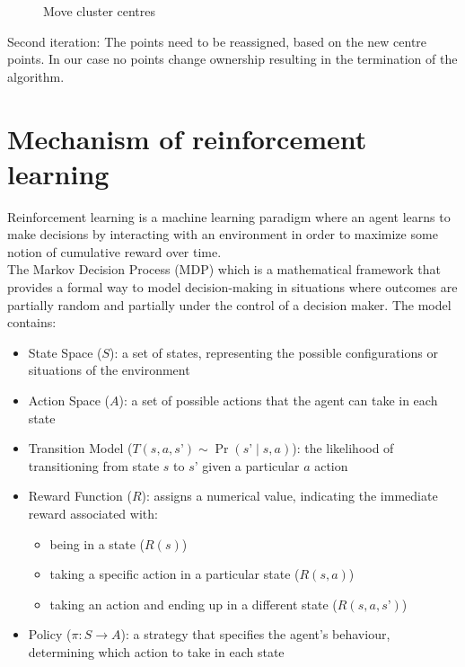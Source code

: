 \documentclass[a4paper,12pt,answers]{article}
\begin{document}
	\begin{figure}[H]
		\centering
		
		\caption{Move cluster centres}
	\end{figure}
	\noindent
	Second iteration: The points need to be reassigned, based on the new centre points. In our case no points change ownership resulting in the termination of the algorithm.
	
	
	
	\newpage
	\section{Mechanism of reinforcement learning}
	Reinforcement learning is a machine learning paradigm where an agent learns to make decisions by interacting with an environment in order to maximize some notion of cumulative reward over time.
	\\[8pt]
	\noindent
	The Markov Decision Process (MDP) which is a mathematical framework that provides a formal way to model decision-making in situations where outcomes are partially random and partially under the control of a decision maker.
	The model contains:
	\begin{itemize}
		\item State Space ($S$): a set of states, representing the possible configurations or situations of the environment
		\item Action Space ($A$): a set of possible actions that the agent can take in each state
		\item Transition Model ($T{(s, a, s’)} \sim \Pr(s’\mid s, a)$): the likelihood of transitioning from state $s$ to $s’$ given a particular $a$ action 
		\item Reward Function ($R$): assigns a numerical value, indicating the immediate reward associated with:
		\begin{itemize}
			\item being in a state ($R(s)$)
			\item taking a specific action in a particular state ($R(s, a)$)
			\item taking an action and ending up in a different state ($R(s, a, s’)$)
		\end{itemize}
		\item Policy ($\pi: S \rightarrow A$): a strategy that specifies the agent's behaviour, determining which action to take in each state
	\end{itemize}
\end{document}
